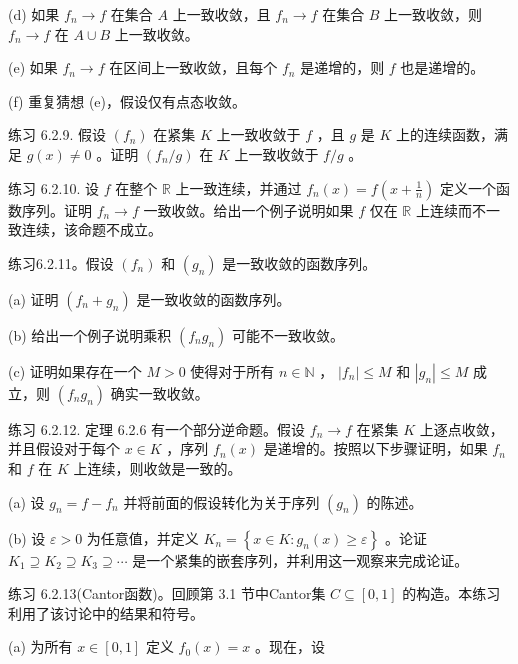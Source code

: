 (d) 如果 \({f}_{n} \rightarrow  f\) 在集合 \(A\) 上一致收敛，且 \({f}_{n} \rightarrow  f\) 在集合 \(B\) 上一致收敛，则 \({f}_{n} \rightarrow  f\) 在 \(A \cup  B\) 上一致收敛。

(e) 如果 \({f}_{n} \rightarrow  f\) 在区间上一致收敛，且每个 \({f}_{n}\) 是递增的，则 \(f\) 也是递增的。

(f) 重复猜想 (e)，假设仅有点态收敛。

练习 6.2.9. 假设 \(\left( {f}_{n}\right)\) 在紧集 \(K\) 上一致收敛于 \(f\) ，且 \(g\) 是 \(K\) 上的连续函数，满足 \(g\left( x\right)  \neq  0\) 。证明 \(\left( {{f}_{n}/g}\right)\) 在 \(K\) 上一致收敛于 \(f/g\) 。

练习 6.2.10. 设 \(f\) 在整个 \(\mathbb{R}\) 上一致连续，并通过 \({f}_{n}\left( x\right)  = f\left( {x + \frac{1}{n}}\right)\) 定义一个函数序列。证明 \({f}_{n} \rightarrow  f\) 一致收敛。给出一个例子说明如果 \(f\) 仅在 \(\mathbb{R}\) 上连续而不一致连续，该命题不成立。

练习6.2.11。假设 \(\left( {f}_{n}\right)\) 和 \(\left( {g}_{n}\right)\) 是一致收敛的函数序列。

(a) 证明 \(\left( {{f}_{n} + {g}_{n}}\right)\) 是一致收敛的函数序列。

(b) 给出一个例子说明乘积 \(\left( {{f}_{n}{g}_{n}}\right)\) 可能不一致收敛。

(c) 证明如果存在一个 \(M > 0\) 使得对于所有 \(n \in  \mathbb{N}\) ， \(\left| {f}_{n}\right|  \leq  M\) 和 \(\left| {g}_{n}\right|  \leq  M\) 成立，则 \(\left( {{f}_{n}{g}_{n}}\right)\) 确实一致收敛。

练习 6.2.12. 定理 6.2.6 有一个部分逆命题。假设 \({f}_{n} \rightarrow  f\) 在紧集 \(K\) 上逐点收敛，并且假设对于每个 \(x \in  K\) ，序列 \({f}_{n}\left( x\right)\) 是递增的。按照以下步骤证明，如果 \({f}_{n}\) 和 \(f\) 在 \(K\) 上连续，则收敛是一致的。

(a) 设 \({g}_{n} = f - {f}_{n}\) 并将前面的假设转化为关于序列 \(\left( {g}_{n}\right)\) 的陈述。

(b) 设 \(\varepsilon  > 0\) 为任意值，并定义 \({K}_{n} = \left\{  {x \in  K : {g}_{n}\left( x\right)  \geq  \varepsilon }\right\}\) 。论证 \({K}_{1} \supseteq  {K}_{2} \supseteq  {K}_{3} \supseteq  \cdots\) 是一个紧集的嵌套序列，并利用这一观察来完成论证。

练习 6.2.13(Cantor函数)。回顾第 3.1 节中Cantor集 \(C \subseteq  \left\lbrack  {0,1}\right\rbrack\) 的构造。本练习利用了该讨论中的结果和符号。

(a) 为所有 \(x \in  \left\lbrack  {0,1}\right\rbrack\) 定义 \({f}_{0}\left( x\right)  = x\) 。现在，设

